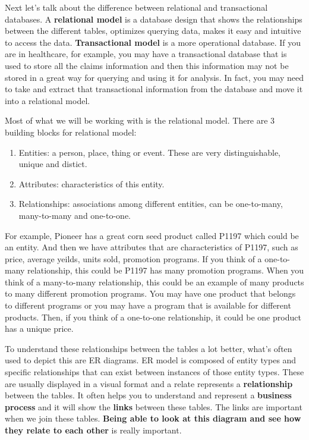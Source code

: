 \documentclass[]{book}
\providecommand{\tightlist}{%
  \setlength{\itemsep}{0pt}\setlength{\parskip}{0pt}}
\theoremstyle{definition}
\theoremstyle{definition}
\theoremstyle{remark}
\begin{document}
Next let's talk about the difference between relational and
transactional databases. A \textbf{relational model} is a database
design that shows the relationships between the different tables,
optimizes querying data, makes it easy and intuitive to access the data.
\textbf{Transactional model} is a more operational database. If you are
in healthcare, for example, you may have a transactional database that
is used to store all the claims information and then this information
may not be stored in a great way for querying and using it for analysis.
In fact, you may need to take and extract that transactional information
from the database and move it into a relational model.

Most of what we will be working with is the relational model. There are
3 building blocks for relational model:

\begin{enumerate}
\def\labelenumi{\arabic{enumi}.}
\tightlist
\item
  Entities: a person, place, thing or event. These are very
  distinguishable, unique and distict.
\item
  Attributes: characteristics of this entity.
\item
  Relationships: associations among different entities, can be
  one-to-many, many-to-many and one-to-one.
\end{enumerate}

For example, Pioneer has a great corn seed product called P1197 which
could be an entity. And then we have attributes that are characteristics
of P1197, such as price, average yeilds, units sold, promotion programs.
If you think of a one-to-many relationship, this could be P1197 has many
promotion programs. When you think of a many-to-many relationship, this
could be an example of many products to many different promotion
programs. You may have one product that belongs to different programs or
you may have a program that is available for different products. Then,
if you think of a one-to-one relationship, it could be one product has a
unique price.

To understand these relationships between the tables a lot better,
what's often used to depict this are ER diagrams. ER model is composed
of entity types and specific relationships that can exist between
instances of those entity types. These are usually displayed in a visual
format and a relate represents a \textbf{relationship} between the
tables. It often helps you to understand and represent a
\textbf{business process} and it will show the \textbf{links} between
these tables. The links are important when we join these tables.
\textbf{Being able to look at this diagram and see how they relate to
each other} is really important.
\end{document}
